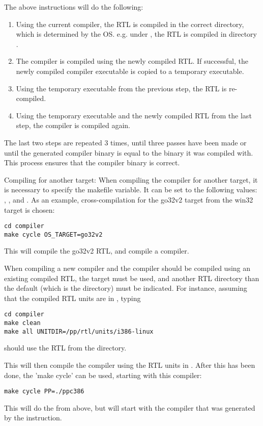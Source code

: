 The above instructions will do the following:
\begin{enumerate}
\item Using the current compiler, the RTL is compiled in the correct
directory, which is determined by the OS. e.g. under \linux,
the RTL is compiled in directory .
\item The compiler is compiled using the newly compiled RTL. If successful,
the newly compiled compiler executable is copied to a temporary executable.
\item Using the temporary executable from the previous step, the RTL is
re-compiled.
\item Using the temporary executable and the newly compiled RTL from the
last step, the compiler is compiled again.
\end{enumerate}
The last two steps are repeated 3 times, until three passes have been made or
until the generated compiler binary is equal to the binary it was compiled
with. This process ensures that the compiler binary is correct.

Compiling for another target:
When compiling the compiler for another target, it is necessary to specify
the  makefile variable. It can be set to the following
values: , ,  and .
As an example, cross-compilation for the go32v2 target from the win32 target
is chosen:
\begin{verbatim}
cd compiler
make cycle OS_TARGET=go32v2
\end{verbatim}
This will compile the go32v2 RTL, and compile a  compiler.

When compiling a new compiler and the compiler should be compiled using an 
existing compiled RTL,  the  target must be used, and another RTL 
directory than the default (which is the  
directory) must be indicated. For instance, assuming that the compiled RTL 
units are in , typing
\begin{verbatim}
cd compiler
make clean
make all UNITDIR=/pp/rtl/units/i386-linux
\end{verbatim}
should use the RTL from the  directory.

This will then compile the compiler using the RTL units in
.
After this has been done, the 'make cycle' can be used, starting with this
compiler:
\begin{verbatim}
make cycle PP=./ppc386
\end{verbatim}
This will do the  from above, but will start with the compiler
that was generated by the  instruction.

